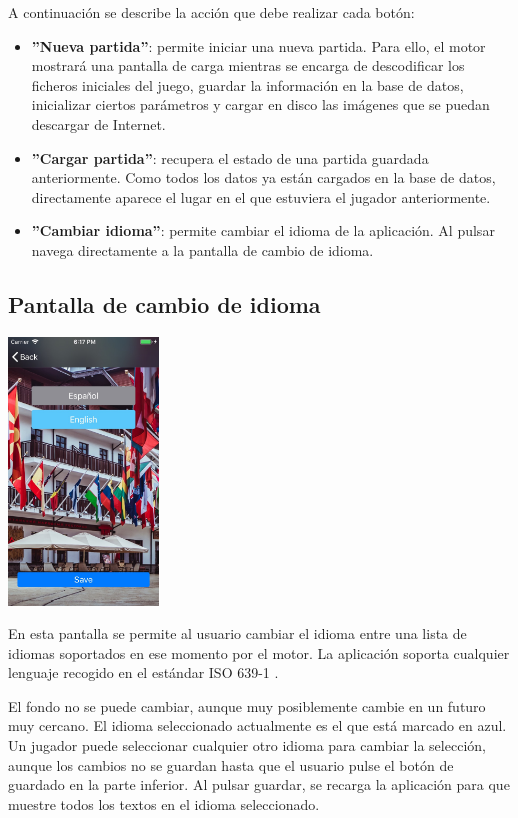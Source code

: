 A continuación se describe la acción que debe realizar cada botón:

\begin{itemize}
	\item \textbf{''Nueva partida''}: permite iniciar una nueva partida. Para ello, el motor mostrará una pantalla de carga mientras se encarga de descodificar los ficheros iniciales del juego, guardar la información en la base de datos, inicializar ciertos parámetros y cargar en disco las imágenes que se puedan descargar de Internet.
	\item \textbf{''Cargar partida''}: recupera el estado de una partida guardada anteriormente. Como todos los datos ya están cargados en la base de datos, directamente aparece el lugar en el que estuviera el jugador anteriormente.
	\item \textbf{''Cambiar idioma''}: permite cambiar el idioma de la aplicación. Al pulsar navega directamente a la pantalla de cambio de idioma.
\end{itemize}

\subsection{Pantalla de cambio de idioma}
\begin{center}
	\includegraphics[width=0.3\textwidth]{include/snapshots/languageSettings.jpg}
\end{center}
En esta pantalla se permite al usuario cambiar el idioma entre una lista de idiomas soportados en ese momento por el motor. La aplicación soporta cualquier lenguaje recogido en el estándar ISO 639-1 \cite{iso639-1Codes}.

El fondo no se puede cambiar, aunque muy posiblemente cambie en un futuro muy cercano.
El idioma seleccionado actualmente es el que está marcado en azul. Un jugador puede seleccionar cualquier otro idioma para cambiar la selección, aunque los cambios no se guardan hasta que el usuario pulse el botón de guardado en la parte inferior.
Al pulsar guardar, se recarga la aplicación para que muestre todos los textos en el idioma seleccionado. 

